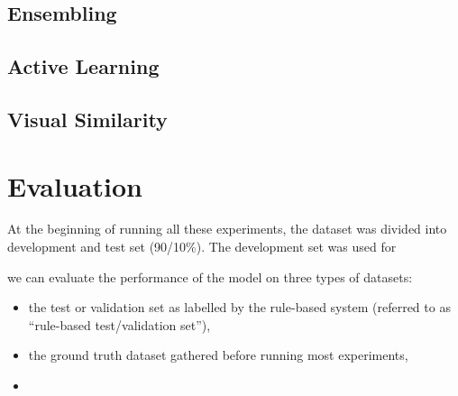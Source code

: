\subsection{Ensembling}
\label{exp_ensembling}

\subsection{Active Learning}
\label{exp_al}

\subsection{Visual Similarity}
\label{exp_models}


\section{Evaluation}
\label{evaluation}

At the beginning of running all these experiments, the dataset was divided into development and test set (90/10\%).
The development set was used for


 we can evaluate the performance of the model on three types of datasets:

\begin{itemize}
  \item the test or validation set as labelled by the rule-based system (referred to as ``rule-based test/validation set''),
  \item the ground truth dataset gathered  before running most experiments,
  \item
\end{itemize}
